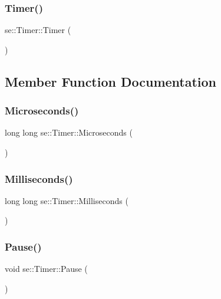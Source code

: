 \subsubsection{\texorpdfstring{Timer()}{Timer()}}
{\footnotesize\ttfamily se\+::\+Timer\+::\+Timer (\begin{DoxyParamCaption}{ }\end{DoxyParamCaption})}



\subsection{Member Function Documentation}
\mbox{\label{classse_1_1_timer_a7fdf38aafc8be894fc25764ff8cabb36}} 
\subsubsection{\texorpdfstring{Microseconds()}{Microseconds()}}
{\footnotesize\ttfamily long long se\+::\+Timer\+::\+Microseconds (\begin{DoxyParamCaption}{ }\end{DoxyParamCaption})}

\mbox{\label{classse_1_1_timer_a9c3fe064b6637f2804c370da786a38d8}} 
\subsubsection{\texorpdfstring{Milliseconds()}{Milliseconds()}}
{\footnotesize\ttfamily long long se\+::\+Timer\+::\+Milliseconds (\begin{DoxyParamCaption}{ }\end{DoxyParamCaption})}

\mbox{\label{classse_1_1_timer_abde91d5d6e7fe0601c0c9607193707d8}} 
\subsubsection{\texorpdfstring{Pause()}{Pause()}}
{\footnotesize\ttfamily void se\+::\+Timer\+::\+Pause (\begin{DoxyParamCaption}{ }\end{DoxyParamCaption})}


